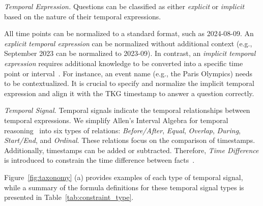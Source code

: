 {\emph{Temporal Expression.}}
Questions can be classified as either \emph{explicit} or \emph{implicit} based on the nature of their temporal expressions.

All time points can be normalized to a standard format, such as 2024-08-09. An \textit{explicit temporal expression} can be normalized without additional context (e.g., September 2023 can be normalized to 2023-09). In contrast, an \textit{implicit temporal expression} requires additional knowledge to be converted into a specific time point or interval~\cite{jiaTempQuestionsBenchmarkTemporal2018}. For instance, an event name (e.g., the Paris Olympics) needs to be contextualized. It is crucial to specify and normalize the implicit temporal expression and align it with the TKG timestamp to answer a question correctly.


{\emph{Temporal Signal.}}
Temporal signals indicate the temporal relationships between temporal expressions.
We simplify Allen’s Interval Algebra for temporal reasoning~\cite{allenMaintainingKnowledgeTemporal1983} into six types of relations: \textit{Before/After}, \textit{Equal}, \textit{Overlap}, \textit{During}, \textit{Start/End}, and \textit{Ordinal}. These relations focus on the comparison of timestamps. Additionally, timestamps can be added or subtracted. Therefore, \textit{Time Difference} is introduced to constrain the time difference between facts~\cite{zhangMusTQTemporalKnowledge2024}. 

Figure~\ref{fig:taxonomy} (a) provides examples of each type of temporal signal, while a summary of the formula definitions for these temporal signal types is presented in Table~\ref{tab:constraint_type}.

